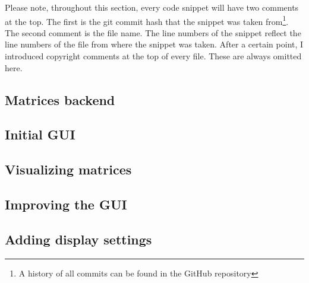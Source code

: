 \documentclass[../main.tex]{subfiles}
\begin{document}
Please note, throughout this section, every code snippet will have two comments at the top. The first is the git commit hash that the snippet was taken from\footnote{A history of all commits can be found in the GitHub repository\cite{lintrans-github}}. The second comment is the file name. The line numbers of the snippet reflect the line numbers of the file from where the snippet was taken. After a certain point, I introduced copyright comments at the top of every file. These are always omitted here.

\subsection{Matrices backend\label{development:matrices-backend}}


\subsection{Initial GUI\label{development:initial-gui}}


\subsection{Visualizing matrices\label{development:visualizing-matrices}}


\subsection{Improving the GUI\label{development:improving-the-gui}}


\subsection{Adding display settings\label{development:adding-display-settings}}

\end{document}
